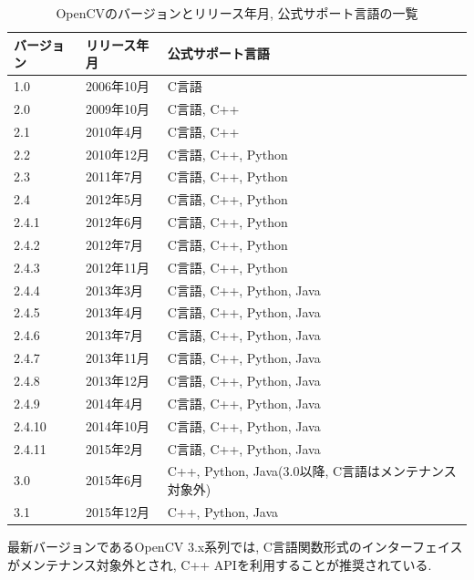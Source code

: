 \begin{table}[tb]
\begin{center}
\begin{tabular}{|l|l|l|} \hline
バージョン & リリース年月 & 公式サポート言語 \\ \hline \hline
1.0 & 2006年10月 & C言語 \\ \hline
2.0 & 2009年10月 & C言語, C++ \\ \hline
2.1 & 2010年4月 & C言語, C++ \\ \hline
2.2 & 2010年12月 & C言語, C++, Python \\ \hline
2.3 & 2011年7月 & C言語, C++, Python \\ \hline
2.4 & 2012年5月 & C言語, C++, Python \\ \hline
2.4.1 & 2012年6月 & C言語, C++, Python \\ \hline
2.4.2 & 2012年7月 & C言語, C++, Python \\ \hline
2.4.3 & 2012年11月 & C言語, C++, Python \\ \hline
2.4.4 & 2013年3月 & C言語, C++, Python, Java \\ \hline
2.4.5 & 2013年4月 & C言語, C++, Python, Java \\ \hline
2.4.6 & 2013年7月 & C言語, C++, Python, Java \\ \hline
2.4.7 & 2013年11月 & C言語, C++, Python, Java \\ \hline
2.4.8 & 2013年12月 & C言語, C++, Python, Java \\ \hline
2.4.9 & 2014年4月 & C言語, C++, Python, Java \\ \hline
2.4.10 & 2014年10月 & C言語, C++, Python, Java \\ \hline
2.4.11 & 2015年2月 & C言語, C++, Python, Java \\ \hline
3.0 & 2015年6月 & C++, Python, Java(3.0以降, C言語はメンテナンス対象外) \\ \hline
3.1 & 2015年12月 & C++, Python, Java \\ \hline
\end{tabular}
\caption{OpenCVのバージョンとリリース年月, 公式サポート言語の一覧}
\end{center}
\end{table}

最新バージョンであるOpenCV 3.x系列では, C言語関数形式のインターフェイスがメンテナンス対象外とされ, C++ APIを利用することが推奨されている.

